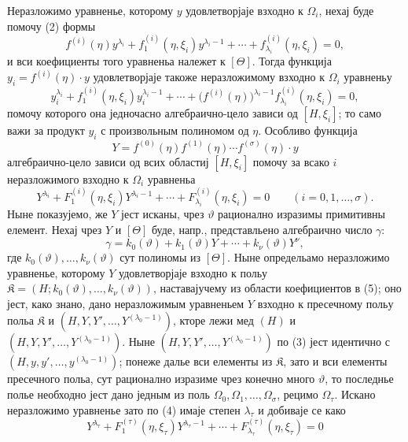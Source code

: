 ﻿\documentclass[11pt]{article}
\begin{document}
Неразложимо уравненье, которому $y$ удовлетворјаје взходно к $\Omega_i$, нехај
буде помочу (2) формы
\[
 f^{(i)}(\eta)y^{\lambda_i}+f_1^{(i)}(\eta,\xi_i)y^{\lambda_i-1}
+\cdots+f_{\lambda_i}^{(i)}(\eta,\xi_i)=0,
\]
и вси коефициенты того уравненьа належет к $[\Theta]$. Тогда функција
$y_i=f^{(i)}(\eta)\cdot y$ удовлетворјаје такоже неразложимому взходно к
$\Omega_i$ уравненьу
\[
 y_i^{\lambda_i}+f_1^{(i)}(\eta,\xi_i)y_i^{\lambda_i-1}
+\cdots+\bigl(f^{(i)}(\eta)\bigr)^{\lambda_i-1}
 f_{\lambda_i}^{(i)}(\eta,\xi_i)=0,
\]
помочу которого она једночасно алгебраично-цело зависи од $[H,\xi_i]$; то само
важи за продукт $y_i$ с произвольным полиномом од $\eta$. Особливо функција
\begin{equation}
Y=f^{(0)}(\eta)f^{(1)}(\eta)\cdots f^{(\sigma)}(\eta)\cdot y
\tag{3}
\end{equation}
алгебраично-цело зависи од всих областиј $[H,\xi_i]$ помочу за всако $i$
неразложимого взходно к $\Omega_i$ уравненьа
\begin{equation}
Y^{\lambda_i}+F_1^{(i)}(\eta,\xi_i)Y^{\lambda_i-1}
+\cdots+F_{\lambda_i}^{(i)}(\eta,\xi_i)=0
\qquad (i=0,1,\ldots,\sigma).
\tag{4}
\end{equation}
Ныне показујемо, же $Y$ јест исканы, чрез $\vartheta$ рационално изразимы
примитивны елемент. Нехај чрез $Y$ и $[\Theta]$ буде, напр., представльено
алгебраично число $\gamma$:
\begin{equation}
\gamma=k_0(\vartheta)+k_1(\vartheta)Y+\cdots+k_\nu(\vartheta)Y^\nu,
\tag{5}
\end{equation}
где $k_0(\vartheta),\ldots,k_\nu(\vartheta)$ сут полиномы из $[\Theta]$. Ныне
определьамо неразложимо уравненье, которому $Y$ удовлетворјаје взходно к польу
$\mathfrak K=(H;k_0(\vartheta),\ldots,k_\nu(\vartheta))$, наставајучему из
области коефициентов в (5); оно јест, како знано, дано неразложимым уравненьем
$Y$ взходно к пресечному польу польа $\mathfrak K$ и
$(H,Y,Y',\ldots,Y^{(\lambda_0-1)})$, кторе лежи мед $(H)$ и
$(H,Y,Y',\ldots,Y^{(\lambda_0-1)})$. Ныне
$(H,Y,Y',\ldots,Y^{(\lambda_0-1)})$ по (3) јест идентично с
$(H,y,y',\ldots,y^{(\lambda_0-1)})$; понеже далье вси
елементы из $\mathfrak K$, зато и вси елементы пресечного польа, сут рационално
изразиме чрез конечно много $\vartheta$, то последнье полье необходно јест дано
једным из поль $\Omega_0,\Omega_1,\ldots,\Omega_\sigma$, рецимо
$\Omega_\tau$. Искано неразложимо уравненье зато по (4) имаје степен
$\lambda_\tau$ и добиваје се како
\begin{equation}
Y^{\lambda_\tau}+F_1^{(\tau)}(\eta,\xi_\tau)Y^{\lambda_\tau-1}
+\cdots+F_{\lambda_\tau}^{(\tau)}(\eta,\xi_\tau)=0
\tag{6}
\end{equation}
\end{document}
